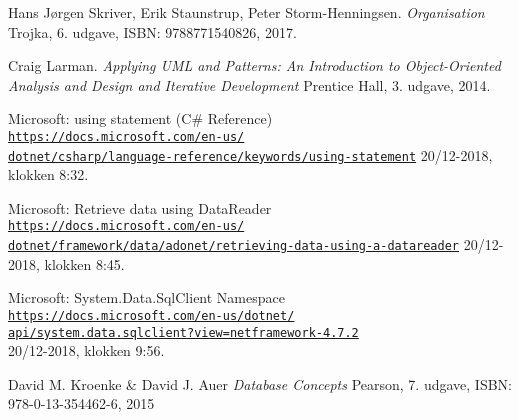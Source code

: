 \begin{thebibliography}{9}

Hans Jørgen Skriver, Erik Staunstrup, Peter Storm-Henningsen.
\textit{Organisation}
Trojka, 6. udgave, ISBN: 9788771540826, 2017.

Craig Larman.
\textit{Applying UML and Patterns: An Introduction to Object-Oriented Analysis and Design and Iterative Development}
Prentice Hall, 3. udgave, 2014.

Microsoft: using statement (C\# Reference)
\\\href{https://docs.microsoft.com/en-us/dotnet/csharp/language-reference/keywords/using-statement}{\texttt{https://docs.microsoft.com/en-us/\\dotnet/csharp/language-reference/keywords/using-statement}}
20/12-2018, klokken 8:32.

Microsoft: Retrieve data using DataReader
\\\href{https://docs.microsoft.com/en-us/dotnet/framework/data/adonet/retrieving-data-using-a-datareader}{\texttt{https://docs.microsoft.com/en-us/\\dotnet/framework/data/adonet/retrieving-data-using-a-datareader}}
20/12-2018, klokken 8:45.

Microsoft: System.Data.SqlClient Namespace
\\\href{https://docs.microsoft.com/en-us/dotnet/api/system.data.sqlclient?view=netframework-4.7.2}{\texttt{https://docs.microsoft.com/en-us/dotnet/\\api/system.data.sqlclient?view=netframework-4.7.2}}
\\20/12-2018, klokken 9:56.

David M. Kroenke \& David J. Auer
\textit{Database Concepts}
Pearson, 7. udgave, ISBN: 978-0-13-354462-6, 2015


\begin{comment}
\bibitem{latexcompanion} 
Michel Goossens, Frank Mittelbach, and Alexander Samarin. 
\textit{The \LaTeX\ Companion}. 
Addison-Wesley, Reading, Massachusetts, 1993.
 
\bibitem{einstein} 
Albert Einstein. 
\textit{Zur Elektrodynamik bewegter K{\"o}rper}. (German) 
[\textit{On the electrodynamics of moving bodies}]. 
Annalen der Physik, 322(10):891–921, 1905.
 
\bibitem{knuthwebsite} 
Knuth: Computers and Typesetting,
\\\texttt{http://www-cs-faculty.stanford.edu/\~{}uno/abcde.html}


\end{comment}
\end{thebibliography}
 
